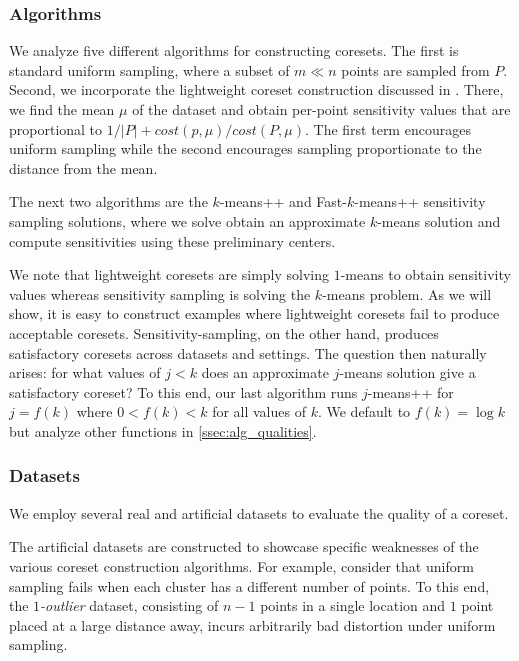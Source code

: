 \subsubsection{Algorithms}

We analyze five different algorithms for constructing coresets. The first is standard uniform sampling, where a subset of $m \ll n$ points are sampled from $P$.
Second, we incorporate the lightweight coreset construction discussed in \cite{lightweight_coresets}. There, we find the mean $\mu$ of the dataset and obtain
per-point sensitivity values that are proportional to $1/|P| + cost(p, \mu) / cost(P, \mu)$. The first term encourages uniform sampling while the second
encourages sampling proportionate to the distance from the mean.

The next two algorithms are the $k$-means++ and Fast-$k$-means++ sensitivity sampling solutions, where we solve obtain an approximate $k$-means solution and
compute sensitivities using these preliminary centers.

We note that lightweight coresets are simply solving $1$-means to obtain sensitivity values whereas sensitivity sampling is solving the $k$-means problem.  As
we will show, it is easy to construct examples where lightweight coresets fail to produce acceptable coresets. Sensitivity-sampling, on the other hand, produces
satisfactory coresets across datasets and settings. The question then naturally arises: for what values of $j < k$ does an approximate $j$-means solution give
a satisfactory coreset? To this end, our last algorithm runs $j$-means++ for $j = f(k)$ where $0 < f(k) < k$ for all values of $k$. We default to $f(k) = \log
k$ but analyze other functions in \ref{ssec:alg_qualities}.

\subsubsection{Datasets}

We employ several real and artificial datasets to evaluate the quality of a coreset.

The artificial datasets are constructed to showcase specific weaknesses of the various coreset construction algorithms. For example, consider that uniform
sampling fails when each cluster has a different number of points. To this end, the \emph{$1$-outlier} dataset, consisting of $n-1$ points in a single location
and $1$ point placed at a large distance away, incurs arbitrarily bad distortion under uniform sampling. 

